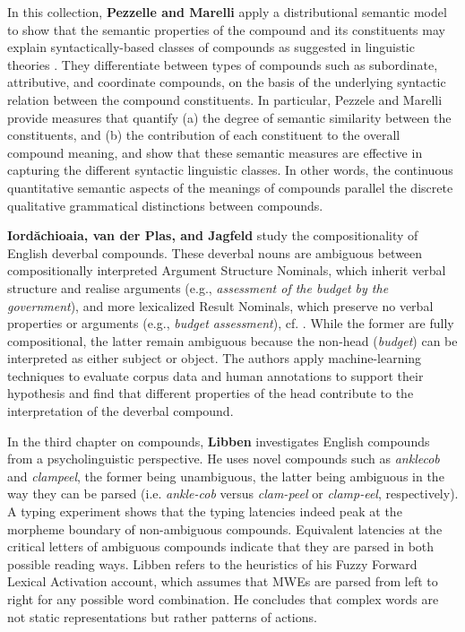 \documentclass[output=paper]{langsci/langscibook}
\begin{document}
In this collection, \textbf{Pezzelle and Marelli} apply a
distributional semantic model to show that the semantic properties of
the compound and its constituents may explain syntactically-based
classes of compounds as suggested in linguistic theories
\citep{Bisetto/Scalise:05}. They differentiate between types of
compounds such as subordinate, attributive, and coordinate compounds,
on the basis of the underlying syntactic relation between the compound
constituents. In particular, Pezzele and Marelli provide measures that
quantify (a) the degree of semantic similarity between the
constituents, and (b) the contribution of each constituent to the
overall compound meaning, and show that these semantic measures are
effective in capturing the different syntactic linguistic classes. In
other words, the continuous quantitative semantic aspects of the
meanings of compounds parallel the discrete qualitative grammatical
distinctions between compounds.

\textbf{Iord\u{a}chioaia, van der Plas, and Jagfeld} study the
compositionality of English deverbal compounds. These deverbal nouns
are ambiguous between compositionally interpreted Argument Structure
Nominals, which inherit verbal structure and realise arguments
(e.g., \textit{assessment of the budget by the government}), and more
lexicalized Result Nominals, which preserve no verbal properties
or arguments (e.g., \textit{budget assessment}),
cf. \cite{grimshaw:90}. While the former are fully compositional, the
latter remain ambiguous because the non-head (\textit{budget}) can be
interpreted as either subject or object. The authors apply
machine-learning techniques to evaluate corpus data and human
annotations to support their hypothesis and find that different
properties of the head contribute to the interpretation of the
deverbal compound.

In the third chapter on compounds, \textbf{Libben} investigates English compounds from a psycholinguistic perspective. He uses novel compounds such as \textit{anklecob} and \textit{clampeel}, the former being unambiguous, the latter being ambiguous in the way they can be parsed (i.e. \textit{ankle-cob} versus \textit{clam-peel} or \textit{clamp-eel}, respectively). A typing experiment shows that the typing latencies indeed peak at the morpheme boundary of non-ambiguous compounds. Equivalent latencies at the critical letters of ambiguous compounds indicate that they are parsed in both possible reading ways. Libben refers to the heuristics of his Fuzzy Forward Lexical Activation account, which assumes that MWEs are parsed from left to right for any possible word combination. He concludes that complex words are not static representations but rather patterns of actions.
\end{document}
